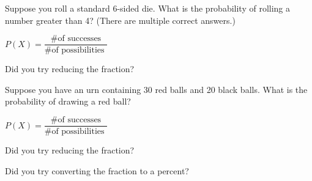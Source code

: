\documentclass{ximera}
\begin{document}
\begin{question}
Suppose you roll a standard 6-sided die. What is the probability of rolling a number greater than 4? (There are multiple correct answers.)
  \begin{solution}
    \begin{multiple-choice}
      \end{multiple-choice}
    \begin{hint}
    $P(X) = \dfrac{ \text{ \# of successes }}{ \text{\# of possibilities } }$
    \end{hint}
    \begin{hint}
    Did you try reducing the fraction?
    \end{hint}
  \end{solution}
\end{question}

\begin{question}
Suppose you have an urn containing 30 red balls and 20 black balls. What is the probability of drawing a red ball?
  \begin{solution}
    \begin{multiple-choice}
      \end{multiple-choice}
    \begin{hint}
    $P(X) = \dfrac{ \text{ \# of successes }}{ \text{\# of possibilities } }$
    \end{hint}
    \begin{hint}
    Did you try reducing the fraction?
    \end{hint}
    \begin{hint}
    Did you try converting the fraction to a percent?
    \end{hint}
  \end{solution}
\end{question}
\end{document}
